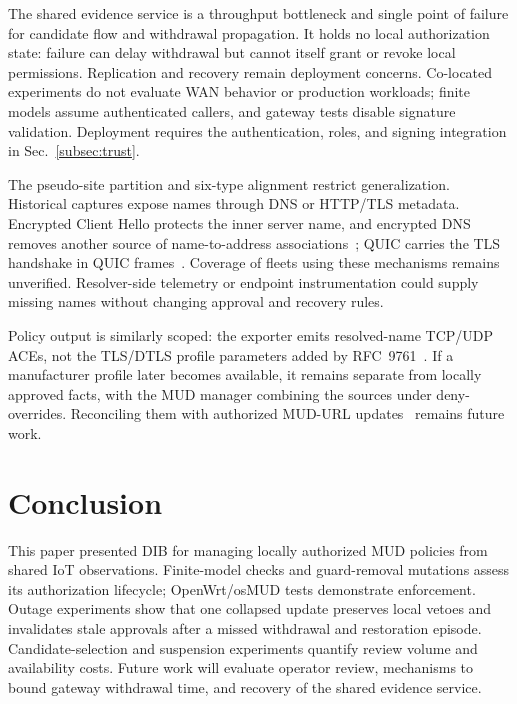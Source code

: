 \documentclass[journal]{IEEEtran}
\theoremstyle{definition}
\begin{document}
The shared evidence service is a throughput bottleneck and single point of failure for candidate flow and withdrawal propagation. It holds no local authorization state: failure can delay withdrawal but cannot itself grant or revoke local permissions. Replication and recovery remain deployment concerns. Co-located experiments do not evaluate WAN behavior or production workloads; finite models assume authenticated callers, and gateway tests disable signature validation. Deployment requires the authentication, roles, and signing integration in Sec.~\ref{subsec:trust}.

The pseudo-site partition and six-type alignment restrict generalization. Historical captures expose names through DNS or HTTP/TLS metadata. Encrypted Client Hello protects the inner server name, and encrypted DNS removes another source of name-to-address associations~\cite{rfc9849}; QUIC carries the TLS handshake in QUIC frames~\cite{rfc9001}. Coverage of fleets using these mechanisms remains unverified. Resolver-side telemetry or endpoint instrumentation could supply missing names without changing approval and recovery rules.

Policy output is similarly scoped: the exporter emits resolved-name TCP/UDP ACEs, not the TLS/DTLS profile parameters added by RFC~9761~\cite{rfc9761}. If a manufacturer profile later becomes available, it remains separate from locally approved facts, with the MUD manager combining the sources under deny-overrides. Reconciling them with authorized MUD-URL updates~\cite{mudacceptableurls} remains future work.



\section{Conclusion}
\label{sec:conclusion}
This paper presented DIB for managing locally authorized MUD policies from shared IoT observations. Finite-model checks and guard-removal mutations assess its authorization lifecycle; OpenWrt/osMUD tests demonstrate enforcement. Outage experiments show that one collapsed update preserves local vetoes and invalidates stale approvals after a missed withdrawal and restoration episode. Candidate-selection and suspension experiments quantify review volume and availability costs. Future work will evaluate operator review, mechanisms to bound gateway withdrawal time, and recovery of the shared evidence service.
\end{document}
